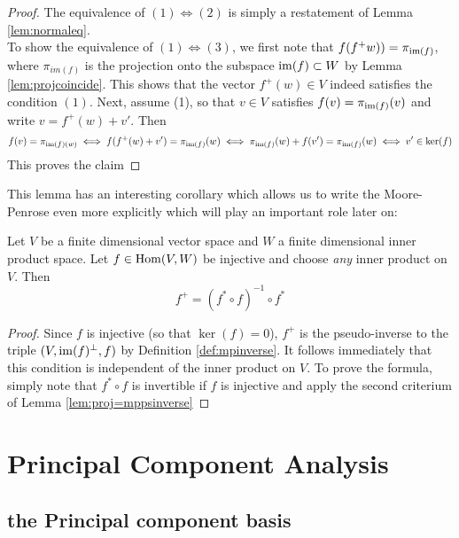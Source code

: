 \begin{proof}
	The equivalence of $(1)\iff (2)$ is simply a restatement of Lemma \ref{lem:normaleq}.\\
	To show the equivalence of $(1)\iff (3)$, we first note that $f(f^+w))=\pi_{\operatorname{im}(f)}$, where $\pi_{im(f)}$ is the projection onto the subspace $\operatorname{im}(f)\subset W$ by Lemma \ref{lem:projcoincide}. This shows that the vector $f^+(w) \in V$ indeed satisfies the condition $(1)$. Next, assume (1), so that $v \in V$ satisfies $f(v)=\pi_{\operatorname{im}(f)}(v)$ and write $v= f^+(w)+v'$. Then\[
	f(v)=\pi_{\operatorname{im}(f)(w)}\iff f(f^+(w)+v')=\pi_{\operatorname{im}(f)}(w)\iff \pi_{\operatorname{im}(f)}(w)+f(v')=\pi_{\operatorname{im}(f)}(w)\iff v'\in \ker(f)
	\]
	This proves the claim
\end{proof}

This lemma has an interesting corollary which allows us to write the Moore-Penrose even more explicitly which will play an important role later on:

\begin{corollary}\label{cor:psinverse-injective}
Let $V$ be a finite dimensional vector space and $W$ a finite dimensional inner product space. Let $f \in \operatorname{Hom}(V,W)$ be injective and choose \emph{any} inner product on $V$. Then
\[
f^+ = (f^*\circ f)^{-1}\circ f^*
\] 
\end{corollary}

\begin{proof}
	Since $f$ is injective (so that $\ker(f)=0$), $f^+$ is the pseudo-inverse to the triple $(V,\operatorname{im}(f)^{\perp},f)$ by Definition \ref{def:mpinverse}. It follows immediately that this condition is independent of the inner product on $V$. To prove the formula, simply note that $f^*\circ f$ is invertible if $f$ is injective and apply the second criterium of Lemma \ref{lem:proj=mppsinverse}
\end{proof}


\section{Principal Component Analysis}
\label{section:principal_component_analysis}

\subsection{the Principal component basis}
\label{subsection:pc_basis}

